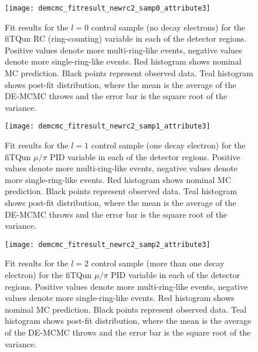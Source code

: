 \begin{figure}[h]
  \begin{center}
    \texttt{[image: demcmc\_fitresult\_newrc2\_samp0\_attribute3]} 
  \end{center}
  \caption{Fit results for the $l=0$ control sample (no decay electrons) for
  the fiTQun RC (ring-counting) variable in each of the detector regions.
  Positive values denote more multi-ring-like events, negative values denote
  more single-ring-like events. Red histogram shows nominal MC prediction.
  Black points represent observed data.  Teal histogram shows post-fit
  distribution, where the mean is the average of the DE-MCMC throws and the
  error bar is the square root of the variance.}
  \label{fig:fitresults_samp0_att3}
\end{figure}


\begin{figure}[h]
  \begin{center}
    \texttt{[image: demcmc\_fitresult\_newrc2\_samp1\_attribute3]} 
  \end{center}
  \caption{Fit results for the $l=1$ control sample (one decay electron) for
  the fiTQun $\mu/\pi$ PID variable in each of the detector regions.  Positive
  values denote more multi-ring-like events, negative values denote more
  single-ring-like events. Red histogram shows nominal MC prediction.  Black
  points represent observed data.  Teal histogram shows post-fit distribution,
  where the mean is the average of the DE-MCMC throws and the error bar is the
  square root of the variance.}
  \label{fig:fitresults_samp1_att3}
\end{figure}


\begin{figure}[h]
  \begin{center}
    \texttt{[image: demcmc\_fitresult\_newrc2\_samp2\_attribute3]} 
  \end{center}
  \caption{Fit results for the $l=2$ control sample (more than one decay
  electron) for the fiTQun $\mu/\pi$ PID variable in each of the detector
  regions.  Positive values denote more multi-ring-like events, negative values
  denote more single-ring-like events.  Red histogram shows nominal MC
  prediction.  Black points represent observed data.  Teal histogram shows
  post-fit distribution, where the mean is the average of the DE-MCMC throws
  and the error bar is the square root of the variance.}
  \label{fig:fitresults_samp2_att3}
\end{figure}

